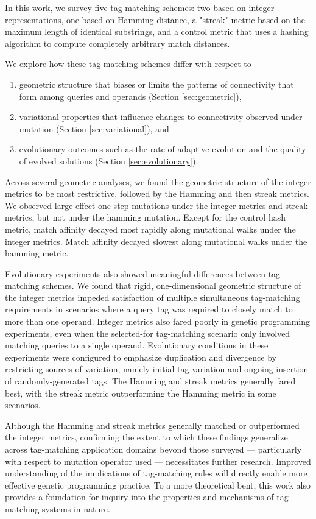 In this work, we survey five tag-matching schemes: two based on integer representations, one based on Hamming distance, a "streak" metric based on the maximum length of identical substrings, and a control metric that uses a hashing algorithm to compute completely arbitrary match distances.

We explore how these tag-matching schemes differ with respect to
\begin{enumerate}
  \item geometric structure that biases or limits the patterns of connectivity that form among queries and operands (Section \ref{sec:geometric}),
  \item variational properties that influence changes to connectivity observed under mutation (Section \ref{sec:variational}), and
  \item evolutionary outcomes such as the rate of adaptive evolution and the quality of evolved solutions (Section \ref{sec:evolutionary}).
\end{enumerate}

Across several geometric analyses, we found the geometric structure of the integer metrics to be most restrictive, followed by the Hamming and then streak metrics.
We observed large-effect one step mutations under the integer metrics and streak metrics, but not under the hamming mutation.
Except for the control hash metric, match affinity decayed most rapidly along mutational walks under the integer metrics.
Match affinity decayed slowest along mutational walks under the hamming metric.

Evolutionary experiments also showed meaningful differences between tag-matching schemes.
We found that rigid, one-dimensional geometric structure of the integer metrics impeded satisfaction of multiple simultaneous tag-matching requirements in scenarios where a query tag was required to closely match to more than one operand.
Integer metrics also fared poorly in genetic programming experiments, even when the selected-for tag-matching scenario only involved matching queries to a single operand.
Evolutionary conditions in these experiments were configured to emphasize duplication and divergence by restricting sources of variation, namely initial tag variation and ongoing insertion of randomly-generated tags.
The Hamming and streak metrics generally fared best, with the streak metric outperforming the Hamming metric in some scenarios.

Although the Hamming and streak metrics generally matched or outperformed the integer metrics, confirming the extent to which these findings generalize across tag-matching application domains beyond those surveyed --- particularly with respect to mutation operator used --- necessitates further research.
Improved understanding of the implications of tag-matching rules will directly enable more effective genetic programming practice.
To a more theoretical bent, this work also provides a foundation for inquiry into the properties and mechanisms of tag-matching systems in nature.

